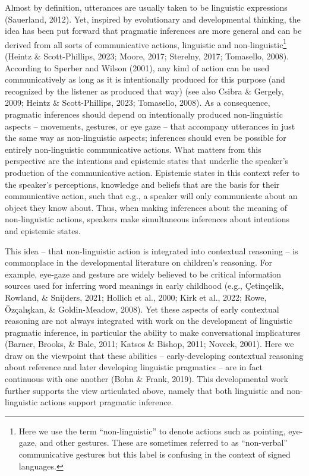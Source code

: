 \documentclass[
  man,floatsintext]{apa6}
\begin{document}
Almost by definition, utterances are usually taken to be linguistic expressions (Sauerland, 2012). Yet, inspired by evolutionary and developmental thinking, the idea has been put forward that pragmatic inferences are more general and can be derived from all sorts of communicative actions, linguistic and non-linguistic\footnote{Here we use the term ``non-linguistic'' to denote actions such as pointing, eye-gaze, and other gestures. These are sometimes referred to as ``non-verbal'' communicative gestures but this label is confusing in the context of signed languages.} (Heintz \& Scott-Phillips, 2023; Moore, 2017; Sterelny, 2017; Tomasello, 2008). According to Sperber and Wilson (2001), any kind of action can be used communicatively as long as it is intentionally produced for this purpose (and recognized by the listener as produced that way) (see also Csibra \& Gergely, 2009; Heintz \& Scott-Phillips, 2023; Tomasello, 2008). As a consequence, pragmatic inferences should depend on intentionally produced non-linguistic aspects -- movements, gestures, or eye gaze -- that accompany utterances in just the same way as non-linguistic aspects; inferences should even be possible for entirely non-linguistic communicative actions. What matters from this perspective are the intentions and epistemic states that underlie the speaker's production of the communicative action. Epistemic states in this context refer to the speaker's perceptions, knowledge and beliefs that are the basis for their communicative action, such that e.g., a speaker will only communicate about an object they know about. Thus, when making inferences about the meaning of non-linguistic actions, speakers make simultaneous inferences about intentions and epistemic states.

This idea -- that non-linguistic action is integrated into contextual reasoning -- is commonplace in the developmental literature on children's reasoning. For example, eye-gaze and gesture are widely believed to be critical information sources used for inferring word meanings in early childhood (e.g., Çetinçelik, Rowland, \& Snijders, 2021; Hollich et al., 2000; Kirk et al., 2022; Rowe, Özçalışkan, \& Goldin-Meadow, 2008). Yet these aspects of early contextual reasoning are not always integrated with work on the development of linguistic pragmatic inference, in particular the ability to make conversational implicatures (Barner, Brooks, \& Bale, 2011; Katsos \& Bishop, 2011; Noveck, 2001). Here we draw on the viewpoint that these abilities -- early-developing contextual reasoning about reference and later developing linguistic pragmatics -- are in fact continuous with one another (Bohn \& Frank, 2019). This developmental work further supports the view articulated above, namely that both linguistic and non-linguistic actions support pragmatic inference.
\end{document}
